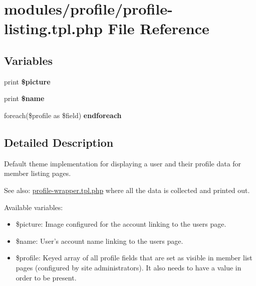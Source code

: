 \hypertarget{profile-listing_8tpl_8php}{
\section{modules/profile/profile-listing.tpl.php File Reference}
\label{profile-listing_8tpl_8php}
}
\subsection*{Variables}
\begin{CompactItemize}
\item 
\hypertarget{profile-listing_8tpl_8php_bb12f8c31dba99f68efccffe9434082c}{
print \textbf{\$picture}}
\label{profile-listing_8tpl_8php_bb12f8c31dba99f68efccffe9434082c}

\item 
\hypertarget{profile-listing_8tpl_8php_3b6a989206ad4aa65f2a35310530d052}{
print \textbf{\$name}}
\label{profile-listing_8tpl_8php_3b6a989206ad4aa65f2a35310530d052}

\item 
\hypertarget{profile-listing_8tpl_8php_786bc7397fe2b18f739bbd3f5a92ff47}{
foreach(\$profile as \$field) \textbf{endforeach}}
\label{profile-listing_8tpl_8php_786bc7397fe2b18f739bbd3f5a92ff47}

\end{CompactItemize}


\subsection{Detailed Description}
Default theme implementation for displaying a user and their profile data for member listing pages.

\begin{Desc}
\item[See also:]\hyperlink{profile-wrapper_8tpl_8php}{profile-wrapper.tpl.php} where all the data is collected and printed out.\end{Desc}
Available variables:\begin{itemize}
\item \$picture: Image configured for the account linking to the users page.\item \$name: User's account name linking to the users page.\item \$profile: Keyed array of all profile fields that are set as visible in member list pages (configured by site administrators). It also needs to have a value in order to be present.\end{itemize}


